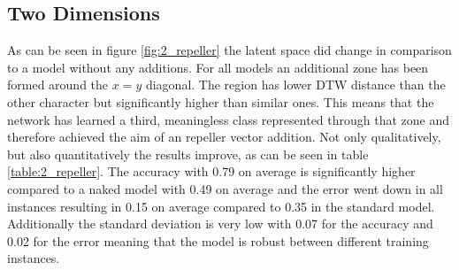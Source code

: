 \subsection{Two Dimensions}

As can be seen in figure \ref{fig:2_repeller} the latent space did change in comparison to a model without any additions. For all models an additional zone has been formed around the $x = y$ diagonal. The region has lower DTW distance than the other character but significantly higher than similar ones. This means that the network has learned a third, meaningless class represented through that zone and therefore achieved the aim of an repeller vector addition. Not only qualitatively, but also quantitatively the results improve, as can be seen in table \ref{table:2_repeller}. The accuracy with 0.79 on average is significantly higher compared to a naked model with 0.49 on average and the error went down in all instances resulting in 0.15 on average compared to 0.35 in the standard model. Additionally the standard deviation is very low with 0.07 for the accuracy and 0.02 for the error meaning that the model is robust between different training instances. 

